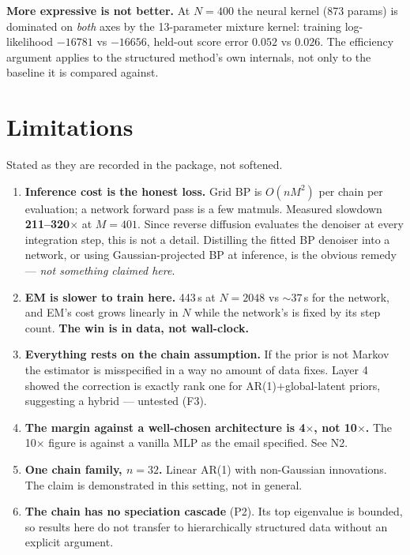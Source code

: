 \documentclass[11pt,a4paper]{article}
\begin{document}
\textbf{More expressive is not better.} At $N=400$ the neural kernel (873 params) is dominated
on \emph{both} axes by the 13-parameter mixture kernel: training log-likelihood $-16781$ vs
$-16656$, held-out score error $0.052$ vs $0.026$. The efficiency argument applies to the
structured method's own internals, not only to the baseline it is compared against.

\newpage
\section{Limitations}
\label{sec:limitations}

Stated as they are recorded in the package, not softened.

\begin{enumerate}
\item \textbf{Inference cost is the honest loss.} Grid BP is $O(nM^2)$ per chain per
evaluation; a network forward pass is a few matmuls. Measured slowdown \textbf{211--320$\times$}
at $M=401$. Since reverse diffusion evaluates the denoiser at every integration step, this is
not a detail. Distilling the fitted BP denoiser into a network, or using Gaussian-projected
BP at inference, is the obvious remedy --- \emph{not something claimed here}.

\item \textbf{EM is slower to train here.} 443\,s at $N=2048$ vs ${\sim}37$\,s for the
network, and EM's cost grows linearly in $N$ while the network's is fixed by its step count.
\textbf{The win is in data, not wall-clock.}

\item \textbf{Everything rests on the chain assumption.} If the prior is not Markov the
estimator is misspecified in a way no amount of data fixes. Layer 4 showed the correction is
exactly rank one for AR(1)$+$global-latent priors, suggesting a hybrid --- untested (F3).

\item \textbf{The margin against a well-chosen architecture is 4$\times$, not 10$\times$.}
The 10$\times$ figure is against a vanilla MLP as the email specified. See N2.

\item \textbf{One chain family, $n=32$.} Linear AR(1) with non-Gaussian innovations. The
claim is demonstrated in this setting, not in general.

\item \textbf{The chain has no speciation cascade} (P2). Its top eigenvalue is bounded, so
results here do not transfer to hierarchically structured data without an explicit argument.


\end{enumerate}
\end{document}
